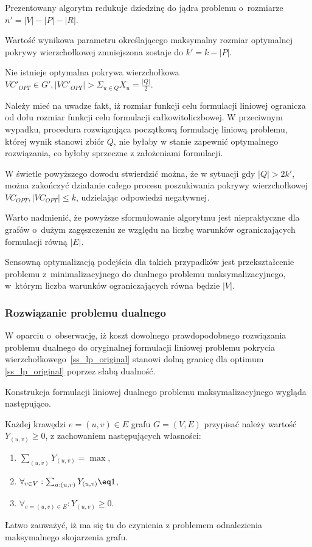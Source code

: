 Prezentowany algorytm redukuje dziedzinę do jądra problemu o~rozmiarze
$n\prime=|V|-|P|-|R|$.

Wartość wynikowa parametru określającego maksymalny rozmiar optymalnej pokrywy
wierzchołkowej zmniejszona zostaje do $k\prime=k-|P|$.

\begin{theorem}
  Nie istnieje optymalna pokrywa wierzchołkowa $VC\prime_{OPT}\in G\prime,|VC\prime_{OPT}|>\Sigma_{u\in Q}X_u=\frac{|Q|}{2}$.
\end{theorem}
\begin{bproof}
  Należy mieć na uwadze fakt, iż rozmiar funkcji celu formulacji liniowej 
  ogranicza od dołu rozmiar funkcji celu formulacji całkowitoliczbowej.
  W przeciwnym wypadku, procedura rozwiązująca początkową formulację liniową
  problemu, której wynik stanowi zbiór $Q$, nie byłaby w stanie zapewnić
  optymalnego rozwiązania, co byłoby sprzeczne z założeniami formulacji.
\end{bproof}

W świetle powyższego dowodu stwierdzić można, że w sytuacji gdy
$|Q|>2k\prime$, można zakończyć działanie całego procesu poszukiwania pokrywy
wierzchołkowej $VC_{OPT}, |VC_{OPT}|\leq k$, udzielając odpowiedzi negatywnej.

Warto nadmienić, że powyższe sformułowanie algorytmu jest niepraktyczne dla
grafów o~dużym zagęszczeniu ze względu na liczbę warunków ograniczających 
formulacji równą $|E|$.

Sensowną optymalizacją podejścia dla takich przypadków jest przekształcenie
problemu z~minimalizacyjnego do dualnego problemu maksymalizacyjnego, 
w~którym liczba warunków ograniczających równa będzie $|V|$.

\subsubsection{\textbf{Rozwiązanie problemu dualnego}}

W oparciu o~obserwację, iż koszt dowolnego prawdopodobnego rozwiązania problemu
dualnego do oryginalnej formulacji liniowej problemu pokrycia
wierzchołkowego~\ref{ss_lp_original} stanowi dolną granicę dla optimum
\ref{ss_lp_original} poprzez słabą dualność. 

Konstrukcja formulacji liniowej dualnego problemu maksymalizacyjnego wygląda
następująco.

Każdej krawędzi $e=(u,v) \in E$ grafu $G=(V,E)$ przypisać należy wartość
$Y_(u,v) \geq 0$, z zachowaniem następujących własności:
\begin{enumerate}
  \item $\sum_{(u,v)}Y_{(u,v)} = \max$,
  \item $\forall_{v \in V}:\sum_{u:(u,v)}Y_{(u,v)}\eq 1$,
  \item $\forall_{e=(u,v) \in E}: Y_{(u,v)} \geq 0$.
\end{enumerate}

Łatwo zauważyć, iż ma się tu do czynienia z problemem odnalezienia maksymalnego
skojarzenia grafu.
